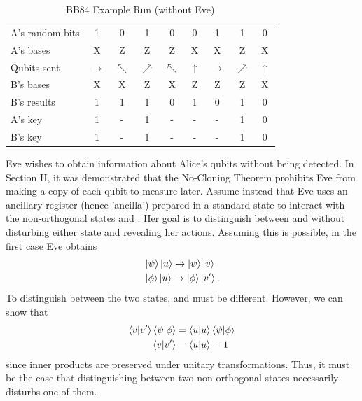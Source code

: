 \documentclass[conference]{IEEEtran}
\begin{document}
\begin{table}[h]
\caption{BB84 Example Run (without Eve)}
\begin{center}
  \begin{tabular}{|l|c c c c c c c c|}
    \hline
    A's random bits & 1 & 0 & 1 & 0 & 0 & 1 & 1 & 0 \\
    A's bases       & X & Z & Z & Z & X & X & Z & X\\
    Qubits sent & $\rightarrow$ & $\nwarrow$ & $\nearrow$ & $\nwarrow$ & $\uparrow$ & $\rightarrow$ & $\nearrow$ & $\uparrow$ \\
    B's bases         & X & X & Z & X & Z & Z & Z & X \\
    B's results       & 1 & 1 & 1 & 0 & 1 & 0 & 1 & 0 \\
    \hline
    A's key        & 1 & - & 1 & - & - & - & 1 & 0 \\
    B's key        & 1 & - & 1 & - & - & - & 1 & 0 \\
    \hline
  \end{tabular}
\end{center}
\end{table}

Eve wishes to obtain information about Alice's qubits without being detected. In Section II, it was demonstrated that the No-Cloning Theorem prohibits Eve from making a copy of each qubit to measure later. Assume instead that Eve uses an ancillary register (hence 'ancilla') prepared in a standard state  to interact with the non-orthogonal states \ket{\psi} and \ket{\phi}. Her goal is to distinguish between \ket{\psi} and \ket{\phi} without disturbing either state and revealing her actions. Assuming this is possible, in the first case Eve obtains
\begin{equation*}
  \begin{split}
    &\left\vert{\psi}\right\rangle\left\vert{u}\right\rangle\rightarrow\left\vert{\psi}\right\rangle\left\vert{v}\right\rangle \\
    &\left\vert{\phi}\right\rangle\left\vert{u}\right\rangle\rightarrow\left\vert{\phi}\right\rangle\left\vert{v'}\right\rangle.
  \end{split}
\end{equation*}
To distinguish between the two states,  and  must be different. However, we can show that
\begin{equation*}
  \begin{split}
    \left\langle{v}\middle\vert{v'}\right\rangle\left\langle{\psi}\middle\vert{\phi}\right\rangle&=\left\langle{u}\middle\vert{u}\right\rangle\left\langle{\psi}\middle\vert{\phi}\right\rangle \\
    \left\langle{v}\middle\vert{v'}\right\rangle&=\left\langle{u}\middle\vert{u}\right\rangle=1
  \end{split}
\end{equation*}
since inner products are preserved under unitary transformations\cite{Nielsen}. Thus, it must be the case that distinguishing between two non-orthogonal states necessarily disturbs one of them.\\
\end{document}
